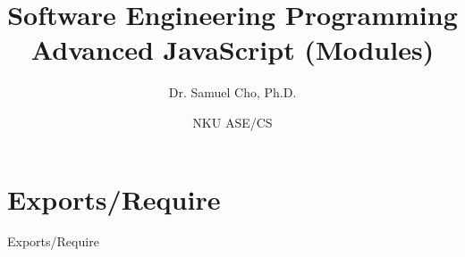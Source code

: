 \documentclass[handout, 14pt]{beamer}
\begin{document}
\title[SE Programming]{Software Engineering Programming\\Advanced JavaScript (Modules)}
\author{Dr. Samuel Cho, Ph.D.} 
\date{NKU ASE/CS} 


{
\begin{frame}
\titlepage
\end{frame}
}

\begin{frame}[fragile]{}
\begin{center} 
    \tableofcontents
\end{center}
\end{frame}

\def\name{Exports/Require}
\section[Require]{\name}
\begin{frame}[fragile]{}%
\begin{center}%
%
%
\name
\end{center}%
\end{frame}
     
\end{document}
